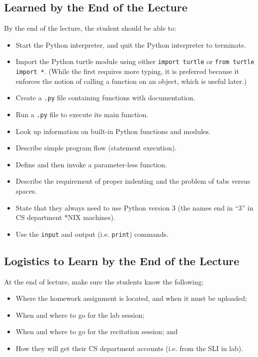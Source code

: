 \documentclass[pdftex,12pt]{artikel3}
\begin{document}
\subsection{Learned by the End of the Lecture}

By the end of the lecture, the student should be able to:
\begin{itemize}
\item
  Start the Python interpreter, and quit the Python interpreter to terminate.
\item
  Import the Python turtle module
  using either {\tt import turtle} or {\tt from turtle import *}.
  (While the first requires more typing, it is preferred because it 
  enforces the notion of calling a function on an object, which is useful later.)
\item
  Create a {\tt .py} file containing functions with documentation.
\item
  Run a {\tt .py} file to execute its main function.
\item
  Look up information on built-in Python functions and modules.
\item
  Describe simple program flow (statement execution).
\item
  Define and then invoke a parameter-less function.
\item
  Describe the requirement of proper indenting
  and the problem of tabs versus spaces.
\item
  State that they always need to use Python version 3
  (the names end in ``3'' in CS department *NIX machines).
\item
  Use the {\tt input} and output (i.e. {\tt print}) commands.
\end{itemize}

\subsection{Logistics to Learn by the End of the Lecture}

At the end of lecture, make sure the students know the following:
\begin{itemize}
\item
  Where the homework assignment is located, and when it must be uploaded;
\item
  When and where to go for the lab session;
\item
  When and where to go for the recitation session; and
\item
  How they will get their CS department accounts (i.e. from the SLI in lab).
\end{itemize}
\end{document}
